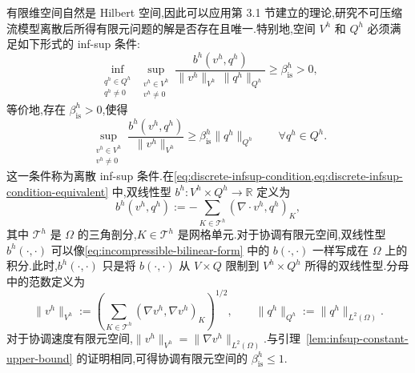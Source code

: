 \begin{note}\label{note:discrete-infsup-condition}
有限维空间自然是 Hilbert 空间,因此可以应用第 3.1 节建立的理论,研究不可压缩流模型离散后所得有限元问题的解是否存在且唯一.特别地,空间 $V^h$ 和 $Q^h$ 必须满足如下形式的 inf-sup 条件:
\begin{equation}\label{eq:discrete-infsup-condition}
  \inf_{\substack{q^h\in Q^h\\q^h\ne0}}
  \sup_{\substack{v^h\in V^h\\v^h\ne0}}
    \frac{b^h(v^h,q^h)}{\|v^h\|_{V^h}\,\|q^h\|_{Q^h}}
      \ge\beta_{\mathrm{is}}^h>0,
\end{equation}
等价地,存在 $\beta_{\mathrm{is}}^h>0$,使得
\begin{equation}\label{eq:discrete-infsup-condition-equivalent}
  \sup_{\substack{v^h\in V^h\\v^h\ne0}}
    \frac{b^h(v^h,q^h)}{\|v^h\|_{V^h}}
      \ge\beta_{\mathrm{is}}^h\|q^h\|_{Q^h}
      \qquad\forall q^h\in Q^h.
\end{equation}
这一条件称为离散 inf-sup 条件.在\cref{eq:discrete-infsup-condition,eq:discrete-infsup-condition-equivalent} 中,双线性型 $b^h:V^h\times Q^h\to\mathbb{R}$ 定义为
\begin{equation}\label{eq:discrete-bilinear-form-b}
  b^h(v^h,q^h):=-\sum_{K\in\mathcal{T}^h}
      (\nabla\cdot v^h,q^h)_K,
\end{equation}
其中 $\mathcal{T}^h$ 是 $\Omega$ 的三角剖分,$K\in\mathcal{T}^h$ 是网格单元.对于协调有限元空间,双线性型 $b^h(\cdot,\cdot)$ 可以像\cref{eq:incompressible-bilinear-form} 中的 $b(\cdot,\cdot)$ 一样写成在 $\Omega$ 上的积分.此时,$b^h(\cdot,\cdot)$ 只是将 $b(\cdot,\cdot)$ 从 $V\times Q$ 限制到 $V^h\times Q^h$ 所得的双线性型.分母中的范数定义为
\begin{equation}\label{eq:discrete-velocity-pressure-norms}
  \|v^h\|_{V^h}:=
    \left(\sum_{K\in\mathcal{T}^h}
       (\nabla v^h,\nabla v^h)_K\right)^{1/2},
  \qquad
  \|q^h\|_{Q^h}:=\|q^h\|_{L^2(\Omega)}.
\end{equation}
对于协调速度有限元空间,$\|v^h\|_{V^h}=\|\nabla v^h\|_{L^2(\Omega)}$.与引理~\ref{lem:infsup-constant-upper-bound} 的证明相同,可得协调有限元空间的 $\beta_{\mathrm{is}}^h\le1$.
\end{note}

